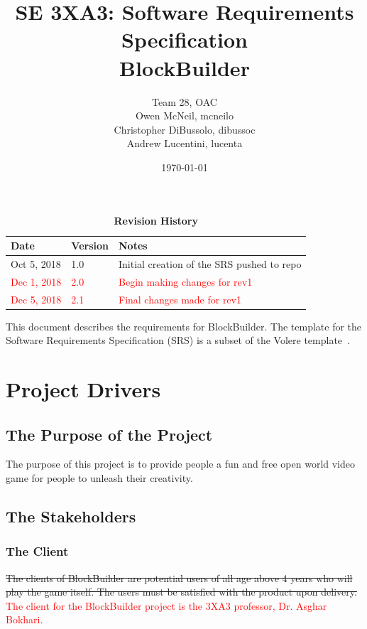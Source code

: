 \documentclass[12pt, titlepage]{article}
\title{SE 3XA3: Software Requirements Specification\\BlockBuilder}
\author{Team 28, OAC
		\\ Owen McNeil, mcneilo
		\\ Christopher DiBussolo, dibussoc
		\\ Andrew Lucentini, lucenta
}
\date{\today}
\begin{document}
\maketitle

\tableofcontents
\listoftables
\listoffigures

\begin{table}[bp]
\caption{\bf Revision History}
\begin{tabularx}{\textwidth}{p{3cm}p{2cm}X}
\toprule {\bf Date} & {\bf Version} & {\bf Notes}\\
\midrule
Oct 5, 2018 & 1.0 & Initial creation of the SRS pushed to repo\\
\midrule
\textcolor{red}{Dec 1, 2018} & \textcolor{red}{2.0} & \textcolor{red}{Begin making changes for rev1}\\
\midrule
\textcolor{red}{Dec 5, 2018} & \textcolor{red}{2.1} & \textcolor{red}{Final changes made for rev1}\\
\bottomrule
\end{tabularx}
\end{table}

\newpage


This document describes the requirements for BlockBuilder. The template for the Software
Requirements Specification (SRS) is a subset of the Volere
template~\citep{RobertsonAndRobertson2012}.

\section{Project Drivers}

\subsection{The Purpose of the Project}
The purpose of this project is to provide people a fun and free open world video game for people to unleash their creativity.
\subsection{The Stakeholders}

\subsubsection{The Client}
\sout{The clients of BlockBuilder are potential users of all age above 4 years who will play the game itself. The users must be satisfied with the product upon delivery.}
\textcolor{red}{The client for the BlockBuilder project is the 3XA3 professor, Dr. Asghar Bokhari.}
\end{document}
